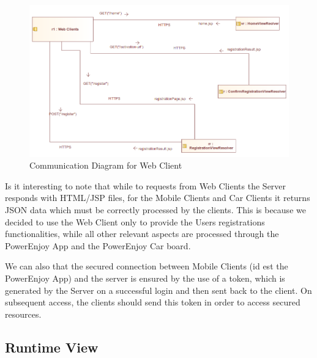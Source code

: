 \documentclass[12pt]{article}
\begin{document}
\FloatBarrier

\begin{figure}[h]
	\centering
	\includegraphics[width=\textwidth]{../Images/WebClient_Communication}
	\caption{Communication Diagram for Web Client}
\end{figure}

Is it interesting to note that while to requests from Web Clients the Server responds with HTML/JSP files, for the Mobile Clients and Car Clients it returns JSON data which must be correctly processed by the clients. This is because we decided to use the Web Client only to provide the Users registrations functionalities, while all other relevant aspects are processed through the PowerEnjoy App and the PowerEnjoy Car board.

We can also that the secured connection between Mobile Clients (id est the PowerEnjoy App) and the server is ensured by the use of a token, which is generated by the Server on a successful login and then sent back to the client. On subsequent access, the clients should send this token in order to access secured resources.
\subsection{Runtime View}
\end{document}
